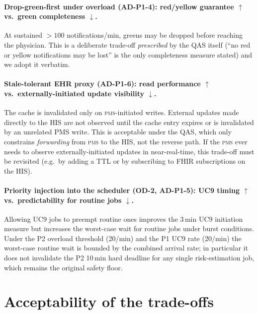 \paragraph{Drop-green-first under overload (AD-P1-4): red/yellow
guarantee $\uparrow$ vs.\ green completeness $\downarrow$.}
At sustained $>100$ notifications/min, greens may be dropped before
reaching the physician. This is a deliberate trade-off \emph{prescribed}
by the QAS itself (``no red or yellow notifications may be lost'' is
the only completeness measure stated) and we adopt it verbatim.

\paragraph{Stale-tolerant EHR proxy (AD-P1-6): read performance $\uparrow$
vs.\ externally-initiated update visibility $\downarrow$.}
The cache is invalidated only on \textsc{pms}-initiated writes. External
updates made directly to the HIS are not observed until the cache entry
expires or is invalidated by an unrelated PMS write. This is acceptable
under the QAS, which only constrains \emph{forwarding} from \textsc{pms}
to the HIS, not the reverse path. If the \textsc{pms} ever needs to
observe externally-initiated updates in near-real-time, this trade-off
must be revisited (e.g.\ by adding a TTL or by subscribing to FHIR
subscriptions on the HIS).

\paragraph{Priority injection into the scheduler (OD-2, AD-P1-5): UC9
timing $\uparrow$ vs.\ predictability for routine jobs $\downarrow$.}
Allowing UC9 jobs to preempt routine ones improves the 3\,min UC9
initiation measure but increases the worst-case wait for routine jobs
under burst conditions. Under the P2 overload threshold (20/min) and
the P1 UC9 rate (20/min) the worst-case routine wait is bounded by the
combined arrival rate; in particular it does not invalidate the P2
10\,min hard deadline for any single risk-estimation job, which remains
the original safety floor.

\section{Acceptability of the trade-offs}

